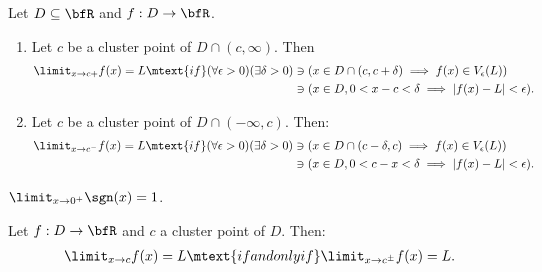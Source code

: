     \begin{definition}
        Let $D \subseteq \bfR$ and $f:D \rightarrow \bfR$.
            \begin{enumerate}[label = (\arabic*)]
                \item Let $c$ be a cluster point of $D \cap (c,\infty)$. Then
                    \begin{equation*}
                    \begin{split}
                        \limit_{x \rightarrow c+}f(x) = L \mtext{if} (\forall \epsilon>0)(\exists \delta > 0)&\ni (x \in D \cap (c,c+\delta) \implies f(x) \in V_\epsilon(L)) \\
                        & \ni (x \in D,0 < x-c < \delta \implies |f(x) - L| < \epsilon).
                    \end{split}
                    \end{equation*}
                
                \item Let $c$ be a cluster point of $D \cap (-\infty,c)$. Then:
                    \begin{equation*}
                    \begin{split}
                        \limit_{x \rightarrow c^{-}}f(x) = L \mtext{if} (\forall \epsilon > 0)(\exists \delta > 0)&\ni (x \in D \cap (c-\delta,c) \implies f(x) \in V_\epsilon(L)) \\
                        &\ni (x \in D, 0 < c - x< \delta \implies |f(x) - L| < \epsilon).
                    \end{split}
                    \end{equation*}
            \end{enumerate}
    \end{definition}

    \begin{example}
        $\limit_{x \rightarrow 0^+}\sgn(x) = 1$.
    \end{example}

    \begin{proposition}
        Let $f:D \rightarrow \bfR$ and $c$ a cluster point of $D$. Then:
            \begin{equation*}
            \begin{split}
                \limit_{x \rightarrow c}f(x) = L \mtext{if and only if } \limit_{x \rightarrow c^{\pm}}f(x) = L.
            \end{split}
            \end{equation*}
    \end{proposition}

